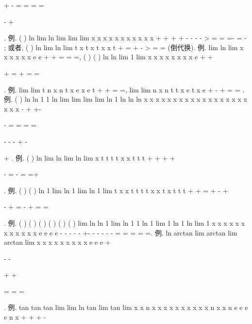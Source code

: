 +
-
=
=
=
=


-
+


. 
\textcolor{lyred}{例}.
(
)
ln
lim
ln
lim
lim
lim
x
x
x
x
x
x
x
x
x
x
x
\alpha 
\alpha 
\alpha 
\alpha 
\alpha 
\alpha 
\alpha 
+
+
+
+
-
-
-
-
\to 
\to 
\to 
\to 
>
=
=
=-
=
-
; 
或者,
(
)
ln
lim
ln
lim
t
x
t
x
t
x
x
t
\alpha 
\alpha 
\alpha 
+
=
\to +\infty 
\to 
-
>
=
=
(倒代换). 
\textcolor{lyred}{例}.
lim
ln
lim
x
x
x
x
x
x
e
e
+
\to 
+
\to 
=
=
=,
(
)
(
)
ln
ln
lim 1
lim
x
x
x
x
x
x
x
x
e
+
+
\to 
\to 


+
=
+
=
=




. 
\textcolor{lyred}{例}.
lim
lim
t
n
x
n
t
x
e
x e
t
+
\to +\infty 
\to 
=
=\infty ,
lim
lim
n
x
n
t
t
x
e
t
x
e
+
-
\to +\infty 
\to 
=
=
. 
\textcolor{lyred}{例}.
(
)
ln
ln
1 1
ln
lim
lim
lim
lim
ln
1 ln
ln
ln
x
x
x
x
x
x
x
x
x
x
x
x
x
x
x
x
x
x
x
x
x
\to 
\to 
\to 
\to 
-
+
+-


-
=
=
=
=


-
-
-
+
-


+
. 
\textcolor{lyred}{例}.
(
)
ln
lim
ln
lim
ln
lim
x
t
t
t
t
x
x
t
t
t
+
+
\to +\infty 
\to 
\to 
+


-
=
-
=
=+\infty 




. 
\textcolor{lyred}{例}.
(
)
(
)
ln 1
lim
ln 1
lim
ln 1
lim
t
x
x
t
t
t
t
x
x
t
x
t
t
t
+
+
=
\to +\infty 
\to 
\to 
-
+






-
+
=
-
+
=
=












. 
\textcolor{lyred}{例}.
(
)
(
)
(
)
(
)
(
)
(
)
lim ln ln 1
lim ln 1
1 ln 1
lim 1
ln 1
ln
lim 1
x
x
x
x
x
x
x
x
x
x
x
x
e
e
e
e
-
-
-
\to 
\to 
\to 
-
-
+-
-
-
-
-
\to 
-
=
=
=
=
=. 
\textcolor{lyred}{例}.
ln
arctan
lim
arctan
lim
arctan
lim
x
x
x
x
x
x
x
x
x
e
e
e
\pi 
\pi 
\pi 
\pi 
\to +\infty 




\cdots 
-
-








\to +\infty 
\to +\infty 

=
=
=




. 
\textcolor{lyred}{例}.
tan
tan
tan
lim
lim
ln
tan
lim
tan
lim
x
x
n
x
x
x x
x
x
x
x
x
x
n
x
x
n
e
e
e
e
n
x
+
+
\to 
\to 
+
-


